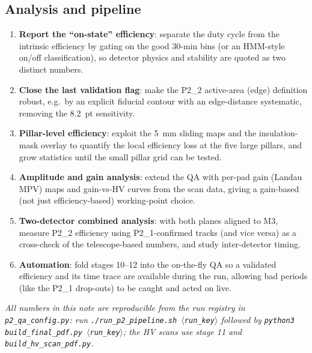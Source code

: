 \documentclass[11pt,a4paper]{article}
\newcommand{\detone}{P2\_1}
\newcommand{\dettwo}{P2\_2}
\newcommand{\code}[1]{\texttt{#1}}
\begin{document}
\subsection{Analysis and pipeline}
\begin{enumerate}[itemsep=2pt]
  \item \textbf{Report the ``on-state'' efficiency}: separate the duty cycle
        from the intrinsic efficiency by gating on the good 30-min bins (or
        an HMM-style on/off classification), so detector physics and
        stability are quoted as two distinct numbers.
  \item \textbf{Close the last validation flag}: make the \dettwo{} active-area
        (edge) definition robust, e.g.\ by an explicit fiducial contour with
        an edge-distance systematic, removing the \SI{8.2}{pt} sensitivity.
  \item \textbf{Pillar-level efficiency}: exploit the \SI{5}{mm} sliding maps
        and the insulation-mask overlay to quantify the local efficiency
        loss at the five large pillars, and grow statistics until the small
        pillar grid can be tested.
  \item \textbf{Amplitude and gain analysis}: extend the QA with per-pad gain
        (Landau MPV) maps and gain-vs-HV curves from the scan data, giving a
        gain-based (not just efficiency-based) working-point choice.
  \item \textbf{Two-detector combined analysis}: with both planes aligned to
        M3, measure \dettwo{} efficiency using \detone{}-confirmed tracks
        (and vice versa) as a cross-check of the telescope-based numbers,
        and study inter-detector timing.
  \item \textbf{Automation}: fold stages 10--12 into the on-the-fly QA so a
        validated efficiency and its time trace are available during the run,
        allowing bad periods (like the \detone{} drop-outs) to be caught and
        acted on live.
\end{enumerate}

\vspace{2ex}
\noindent\textit{All numbers in this note are reproducible from the run
registry in \code{p2\_qa\_config.py}: run
\code{./run\_p2\_pipeline.sh $\langle$run\_key$\rangle$} followed by
\code{python3 build\_final\_pdf.py $\langle$run\_key$\rangle$}; the HV scans
use stage 11 and \code{build\_hv\_scan\_pdf.py}.}
\end{document}
